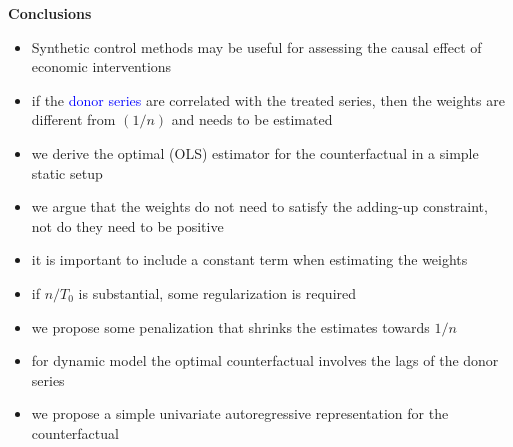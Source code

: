 \documentclass{beamer}
\newcommand{\blue}[1]{\textcolor{blue}{#1}}
\begin{document}
\begin{frame}{\bf Conclusions}

\begin{itemize}
\item Synthetic control methods may be useful for assessing the \alert{causal} effect of economic interventions
\item if the \blue{donor series} are correlated with the treated series, then the weights are different from $(1/n)$ and needs to be estimated
\item we derive the optimal (OLS) estimator for the counterfactual in a simple static setup
\item we argue that the weights do not need to satisfy the adding-up constraint, not do they need to be positive
\item it is important to include a constant term when estimating the weights
\item if $n/T_0$ is substantial, some regularization is required
\item we propose some penalization that shrinks the estimates towards $1/n$
\item for dynamic model the optimal counterfactual involves the lags of the donor series
\item we propose a simple univariate autoregressive representation for the counterfactual
\end{itemize}
\end{frame}
\end{document}
